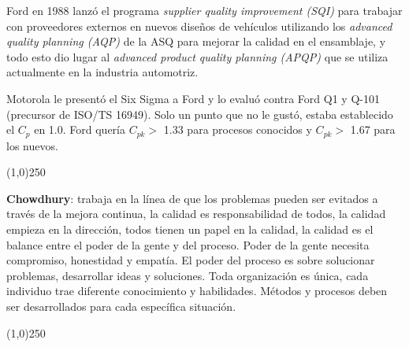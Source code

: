 \documentclass[]{article}
\begin{document}
Ford en 1988 lanzó el programa \textit{supplier quality improvement (SQI)} para trabajar con proveedores externos en nuevos diseños de vehículos utilizando los \textit{advanced quality planning (AQP)} de la ASQ para mejorar la calidad en el ensamblaje, y todo esto dio lugar al \textit{advanced product quality planning (APQP)} que se utiliza actualmente en la industria automotriz. 

Motorola le presentó el Six Sigma a Ford y lo evaluó contra Ford Q1 y Q-101 (precursor de ISO/TS 16949). Solo un punto que no le gustó, estaba establecido el $C_p$ en 1.0. Ford quería $C_{pk} >$ 1.33 para procesos conocidos y $C_{pk} >$ 1.67 para los nuevos.

\begin{center}
	\line(1,0){250}
\end{center}

\textbf{Chowdhury}: trabaja en la línea de que los problemas pueden ser evitados a través de la mejora continua, la calidad es responsabilidad de todos, la calidad empieza en la dirección, todos tienen un papel en la calidad, la calidad es el balance entre el poder de la gente y del proceso. Poder de la gente necesita compromiso, honestidad y empatía. El poder del proceso es sobre solucionar problemas, desarrollar ideas y soluciones. Toda organización es única, cada individuo trae diferente conocimiento y habilidades. Métodos y procesos deben ser desarrollados para cada específica situación.

\begin{center}
	\line(1,0){250}
\end{center}
\end{document}
